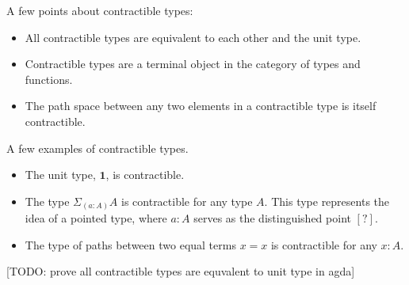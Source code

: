 \documentclass{article}
\begin{document}
\begin{remark}[Properties]
  A few points about contractible types:
  \begin{itemize}
    \item All contractible types are equivalent to each other and the unit type.

    \item Contractible types are a terminal object in the category of types and functions.

    \item The path space between any two elements in a contractible type is itself contractible.
  \end{itemize}
\end{remark}
\begin{remark}[Examples]
   A few examples of contractible types.
  \begin{itemize}
    \item The unit type, $\mathbf{1}$, is contractible.

    \item The type $\Sigma_{(a : A)} A$ is contractible for any type $A$. This type represents the idea of a pointed type, where $a : A$ serves as the distinguished point $\mathbf{[?]}$.

    \item The type of paths between two equal terms $x = x$ is contractible for any $x : A$.

  \end{itemize}
\end{remark}

[TODO: prove all contractible types are equvalent to unit type in agda]
\end{document}
